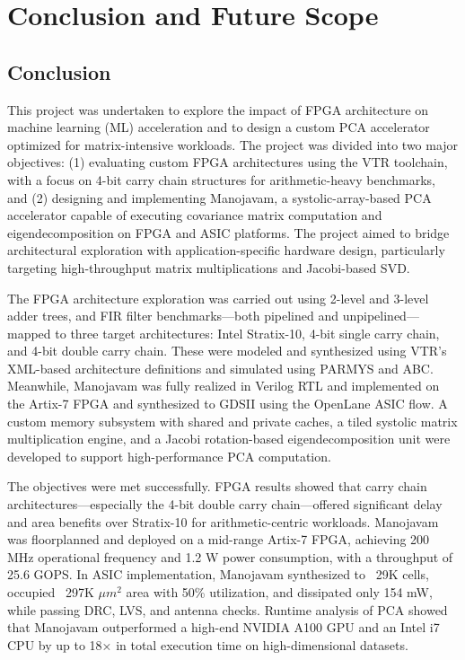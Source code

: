 \chapter{Conclusion and Future Scope}

\section{Conclusion}
This project was undertaken to explore the impact of FPGA architecture on machine learning (ML) acceleration and to design a custom PCA accelerator optimized for matrix-intensive workloads. The project was divided into two major objectives: (1) evaluating custom FPGA architectures using the VTR toolchain, with a focus on 4-bit carry chain structures for arithmetic-heavy benchmarks, and (2) designing and implementing Manojavam, a systolic-array-based PCA accelerator capable of executing covariance matrix computation and eigendecomposition on FPGA and ASIC platforms. The project aimed to bridge architectural exploration with application-specific hardware design, particularly targeting high-throughput matrix multiplications and Jacobi-based SVD.

The FPGA architecture exploration was carried out using 2-level and 3-level adder trees, and FIR filter benchmarks—both pipelined and unpipelined—mapped to three target architectures: Intel Stratix-10, 4-bit single carry chain, and 4-bit double carry chain. These were modeled and synthesized using VTR’s XML-based architecture definitions and simulated using PARMYS and ABC. Meanwhile, Manojavam was fully realized in Verilog RTL and implemented on the Artix-7 FPGA and synthesized to GDSII using the OpenLane ASIC flow. A custom memory subsystem with shared and private caches, a tiled systolic matrix multiplication engine, and a Jacobi rotation-based eigendecomposition unit were developed to support high-performance PCA computation.

The objectives were met successfully. FPGA results showed that carry chain architectures—especially the 4-bit double carry chain—offered significant delay and area benefits over Stratix-10 for arithmetic-centric workloads. Manojavam was floorplanned and deployed on a mid-range Artix-7 FPGA, achieving 200 MHz operational frequency and 1.2 W power consumption, with a throughput of 25.6 GOPS. In ASIC implementation, Manojavam synthesized to ~29K cells, occupied ~297K $\mu m^{2}$ area with 50\% utilization, and dissipated only 154 mW, while passing DRC, LVS, and antenna checks. Runtime analysis of PCA showed that Manojavam outperformed a high-end NVIDIA A100 GPU and an Intel i7 CPU by up to 18× in total execution time on high-dimensional datasets.

